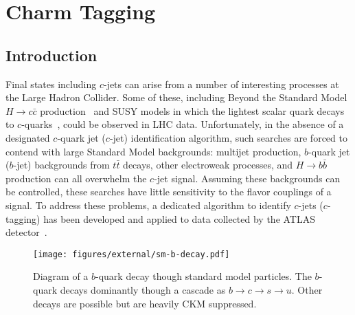 \chapter{Charm Tagging}

\section{Introduction}
\label{tag:sec:into}

\newcommand{\jfcplotswherefrom}{The jets are from $t \bar{t}$ simulated events generated with \textsc{Powheg+Pythia6}.}
\newcommand{\wherefrom}{The jets are from $t \bar{t}$ simulated events generated with \textsc{Powheg+Pythia6}.}

Final states including $c$-jets can arise from a number of interesting processes at the Large Hadron Collider.
Some of these, including Beyond the Standard Model $H \to c\bar{c}$ production~\cite{charminghiggs} and SUSY models in which the lightest scalar quark decays to $c$-quarks~\cite{stoptocharm}, could be observed in LHC data.
Unfortunately, in the absence of a designated $c$-quark jet ($c$-jet) identification algorithm, such searches are forced to contend with large Standard Model backgrounds: multijet production, $b$-quark jet ($b$-jet) backgrounds from $t\bar{t}$ decays, other electroweak processes, and $H \to b\bar{b}$ production can all overwhelm the $c$-jet signal.
Assuming these backgrounds can be controlled, these searches have little sensitivity to the flavor couplings of a signal.
To address these problems, a dedicated algorithm to identify $c$-jets ($c$-tagging) has been developed and applied to data collected by the ATLAS detector~\cite{DetPap}.

\begin{figure}
  \begin{center}
\texttt{[image: figures/external/sm-b-decay.pdf]}
\caption[The decay chain of a $b$-quark]{Diagram of a $b$-quark decay though standard model particles. The $b$-quark decays dominantly though a cascade as $b \to c \to s \to u$. Other decays are possible but are heavily CKM suppressed.}
\label{fig:sm-b-decay}
  \end{center}
\end{figure}

